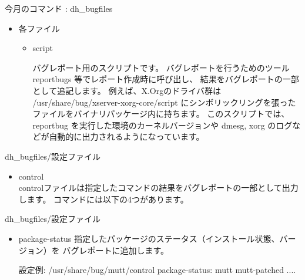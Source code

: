 \begin{frame}[containsverbatim]{今月のコマンド : dh\_bugfiles}
\begin{itemize}
  \item 各ファイル\\
  \begin{itemize}
    \item script

バグレポート用のスクリプトです。
バグレポートを行うためのツールreportbugs 等でレポート作成時に呼び出し、
結果をバグレポートの一部として追記します。
例えば、X.Orgのドライバ群は /usr/share/bug/xserver-xorg-core/script 
にシンボリックリングを張ったファイルをバイナリパッケージ内に持ちます。
このスクリプトでは、reportbug を実行した環境のカーネルバージョンや 
dmesg, xorg のログなどが自動的に出力されるようになっています。

  \end{itemize}
\end{itemize}
\end{frame}

\begin{frame}[containsverbatim]{dh\_bugfiles/設定ファイル}
  \begin{itemize}
  \item control\\

controlファイルは指定したコマンドの結果をバグレポートの一部として出力します。
コマンドには以下の4つがあります。

  \end{itemize}
\end{frame}
\begin{frame}[containsverbatim]{dh\_bugfiles/設定ファイル}
    \begin{itemize}
    \item package-status
指定したパッケージのステータス（インストール状態、バージョン）を
バグレポートに追加します。

\begin{commandline}
設定例:
/usr/share/bug/mutt/control package-status: mutt mutt-patched ....
\end{commandline}
    \end{itemize}
\end{frame}

